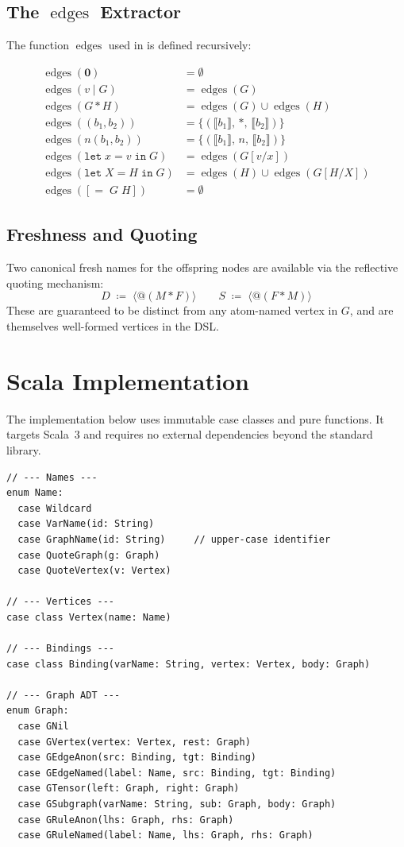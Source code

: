 \documentclass[11pt, a4paper]{article}
\theoremstyle{definition}
\theoremstyle{plain}
\theoremstyle{remark}
\newcommand{\edges}{\operatorname{edges}}
\newcommand{\GNil}{\mathbf{0}}
\newcommand{\tensor}{\mathbin{*}}
\begin{document}
\subsection{The \texorpdfstring{$\edges$}{edges} Extractor}

The function $\edges$ used in  is defined recursively:

\begin{align*}
  \edges(\GNil) &= \emptyset\\
  \edges(v \mid G) &= \edges(G)\\
  \edges(G \tensor H) &= \edges(G) \cup \edges(H)\\
  \edges((b_1, b_2)) &= \{(\llbracket b_1\rrbracket,\, *,\, \llbracket b_2\rrbracket)\}\\
  \edges(n(b_1, b_2)) &= \{(\llbracket b_1\rrbracket,\, n,\, \llbracket b_2\rrbracket)\}\\
  \edges(\texttt{let}\; x = v\; \texttt{in}\; G) &= \edges(G[v/x])\\
  \edges(\texttt{let}\; X = H\; \texttt{in}\; G) &= \edges(H) \cup \edges(G[H/X])\\
  \edges([{=}\;G\;H]) &= \emptyset
\end{align*}

\subsection{Freshness and Quoting}

Two canonical fresh names for the offspring nodes are available via the
reflective quoting mechanism:
\[
  D \;\coloneqq\; \langle @(M \tensor F) \rangle
  \qquad
  S \;\coloneqq\; \langle @(F \tensor M) \rangle
\]
These are guaranteed to be distinct from any atom-named vertex in $G$, and are
themselves well-formed vertices in the DSL.

\section{Scala Implementation}
\label{app:scala}

The implementation below uses immutable case classes and pure functions.  It
targets Scala~3 and requires no external dependencies beyond the standard
library.

\begin{lstlisting}[style=scala, caption={Core graph ADT}]
// --- Names ---
enum Name:
  case Wildcard
  case VarName(id: String)
  case GraphName(id: String)     // upper-case identifier
  case QuoteGraph(g: Graph)
  case QuoteVertex(v: Vertex)

// --- Vertices ---
case class Vertex(name: Name)

// --- Bindings ---
case class Binding(varName: String, vertex: Vertex, body: Graph)

// --- Graph ADT ---
enum Graph:
  case GNil
  case GVertex(vertex: Vertex, rest: Graph)
  case GEdgeAnon(src: Binding, tgt: Binding)
  case GEdgeNamed(label: Name, src: Binding, tgt: Binding)
  case GTensor(left: Graph, right: Graph)
  case GSubgraph(varName: String, sub: Graph, body: Graph)
  case GRuleAnon(lhs: Graph, rhs: Graph)
  case GRuleNamed(label: Name, lhs: Graph, rhs: Graph)
\end{lstlisting}
\end{document}
